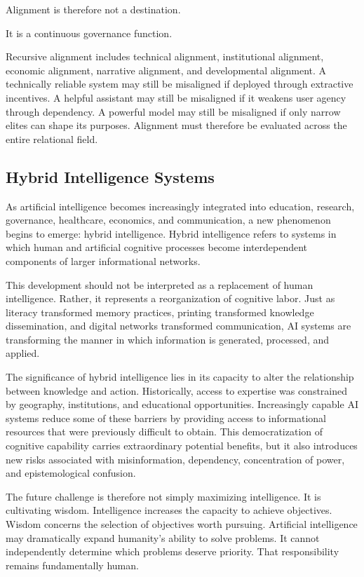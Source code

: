 \documentclass[12pt]{article}
\begin{document}
Alignment is therefore not a destination.

It is a continuous governance function.

Recursive alignment includes technical alignment, institutional alignment, economic alignment, narrative alignment, and developmental alignment. A technically reliable system may still be misaligned if deployed through extractive incentives. A helpful assistant may still be misaligned if it weakens user agency through dependency. A powerful model may still be misaligned if only narrow elites can shape its purposes. Alignment must therefore be evaluated across the entire relational field.

\subsection{Hybrid Intelligence Systems}

As artificial intelligence becomes increasingly integrated into education, research, governance, healthcare, economics, and communication, a new phenomenon begins to emerge: hybrid intelligence. Hybrid intelligence refers to systems in which human and artificial cognitive processes become interdependent components of larger informational networks.

This development should not be interpreted as a replacement of human intelligence. Rather, it represents a reorganization of cognitive labor. Just as literacy transformed memory practices, printing transformed knowledge dissemination, and digital networks transformed communication, AI systems are transforming the manner in which information is generated, processed, and applied.

The significance of hybrid intelligence lies in its capacity to alter the relationship between knowledge and action. Historically, access to expertise was constrained by geography, institutions, and educational opportunities. Increasingly capable AI systems reduce some of these barriers by providing access to informational resources that were previously difficult to obtain. This democratization of cognitive capability carries extraordinary potential benefits, but it also introduces new risks associated with misinformation, dependency, concentration of power, and epistemological confusion.

The future challenge is therefore not simply maximizing intelligence. It is cultivating wisdom. Intelligence increases the capacity to achieve objectives. Wisdom concerns the selection of objectives worth pursuing. Artificial intelligence may dramatically expand humanity's ability to solve problems. It cannot independently determine which problems deserve priority. That responsibility remains fundamentally human.
\end{document}
